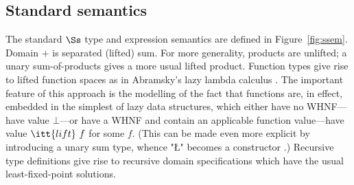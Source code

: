 \documentclass[11pt]{article}
\begin{document}

\subsection{Standard semantics}

The standard $\Ss$ type and expression semantics are defined in
Figure~\ref{fig:ssem}.  
Domain $\plus$ is separated (lifted) sum.  
For more generality, products are unlifted; a unary sum-of-products gives a
more usual lifted product.  
Function types give rise to lifted function
spaces as in Abramsky's lazy lambda calculus \cite{Abr89}.
The important feature of this approach is the modelling of the
fact that functions are, in effect, embedded in the simplest of
lazy data structures, which either have no WHNF---have value $\bot$---or
have a WHNF and contain an applicable function value---have value
$\itt{lift}~f$ for some $f$.  (This can be made even more explicit by
introducing a unary sum type, whence "\L" becomes a constructor \cite{Dav94}.)
Recursive type definitions give rise to recursive domain
specifications which have the usual least-fixed-point solutions.

\end{document}
